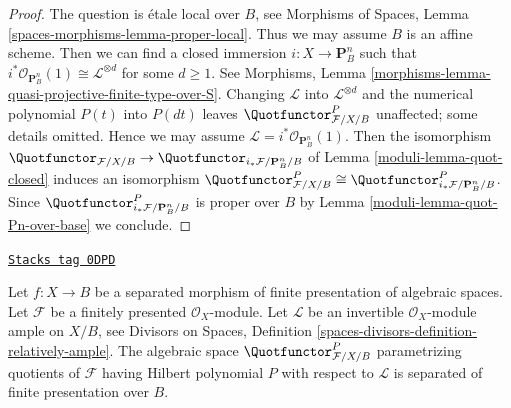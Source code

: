 \begin{proof}

The question is \'etale local over $B$, see
Morphisms of Spaces, Lemma \ref{spaces-morphisms-lemma-proper-local}.
Thus we may assume $B$ is an affine scheme.
Then we can find a closed immersion $i : X \to \mathbf{P}^n_B$
such that $i^*\mathcal{O}_{\mathbf{P}^n_B}(1) \cong \mathcal{L}^{\otimes d}$
for some $d \geq 1$. See
Morphisms, Lemma \ref{morphisms-lemma-quasi-projective-finite-type-over-S}.
Changing $\mathcal{L}$ into $\mathcal{L}^{\otimes d}$ and
the numerical polynomial $P(t)$ into $P(dt)$ leaves
$\Quotfunctor^P_{\mathcal{F}/X/B}$ unaffected; some details omitted.
Hence we may assume $\mathcal{L} = i^*\mathcal{O}_{\mathbf{P}^n_B}(1)$.
Then the isomorphism
$\Quotfunctor_{\mathcal{F}/X/B} \to
\Quotfunctor_{i_*\mathcal{F}/\mathbf{P}^n_B/B}$ of
Lemma \ref{moduli-lemma-quot-closed} induces an isomorphism
$\Quotfunctor^P_{\mathcal{F}/X/B} \cong
\Quotfunctor^P_{i_*\mathcal{F}/\mathbf{P}^n_B/B}$.
Since $\Quotfunctor^P_{i_*\mathcal{F}/\mathbf{P}^n_B/B}$
is proper over $B$ by Lemma \ref{moduli-lemma-quot-Pn-over-base}
we conclude.
\end{proof}

\begin{lemma}
\label{moduli-lemma-quot-qc-over-base}
\href{https://stacks.math.columbia.edu/tag/0DPD}{\texttt{Stacks tag 0DPD}}

Let $f : X \to B$ be a separated morphism of finite presentation
of algebraic spaces. Let $\mathcal{F}$ be a finitely presented
$\mathcal{O}_X$-module. Let $\mathcal{L}$ be an invertible
$\mathcal{O}_X$-module ample on $X/B$, see
Divisors on Spaces, Definition
\ref{spaces-divisors-definition-relatively-ample}.
The algebraic space $\Quotfunctor^P_{\mathcal{F}/X/B}$
parametrizing quotients of $\mathcal{F}$
having Hilbert polynomial $P$ with respect to $\mathcal{L}$
is separated of finite presentation over $B$.
\end{lemma}

